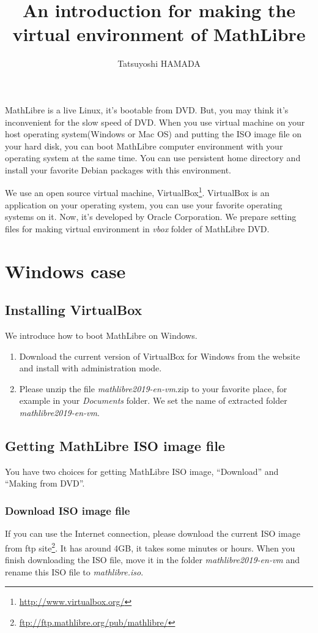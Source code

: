\documentclass[a4]{article}
\title{An introduction for making the virtual environment of MathLibre}
\author{Tatsuyoshi HAMADA}
\newcommand{\vm}{{\em mathlibre2019-en-vm}}
\begin{document}
\maketitle
MathLibre is a live Linux, it's bootable from DVD.
But, you may think it's inconvenient for the slow speed of DVD.
When you use virtual machine on your host operating system(Windows or Mac OS) and
putting the ISO image file on your hard disk,
you can boot MathLibre computer environment with your operating system
at the same time.
You can use persistent home directory and install your favorite Debian
packages with this environment.

We use an open source virtual machine,
VirtualBox\footnote{\url{http://www.virtualbox.org/}}.
VirtualBox is an application on your operating system,
you can use your favorite operating systems on it.
Now, it's developed by Oracle Corporation.
We prepare setting files for making virtual environment 
in {\em vbox} folder of MathLibre DVD.

\section{Windows case}
\subsection{Installing VirtualBox}
We introduce how to boot MathLibre on Windows.
\begin{enumerate}
 \item Download the current version of VirtualBox for Windows from the
       website and install with administration mode.
 \item Please unzip the file \vm.zip{} to your favorite place, for example
       in your {\em Documents} folder. We set the name of extracted folder \vm{}.
\end{enumerate}

\subsection{Getting MathLibre ISO image file}
You have two choices for getting MathLibre ISO image,
``Download'' and ``Making from DVD''.

\subsubsection{Download ISO image file}
If you can use the Internet connection,
please download the current ISO image from ftp site\footnote{\url{ftp://ftp.mathlibre.org/pub/mathlibre/}}.
It has around 4GB, it takes some minutes or hours.
When you finish downloading the ISO file,
move it in the folder \vm{} and rename this ISO file to
{\em mathlibre.iso}. 
\end{document}
